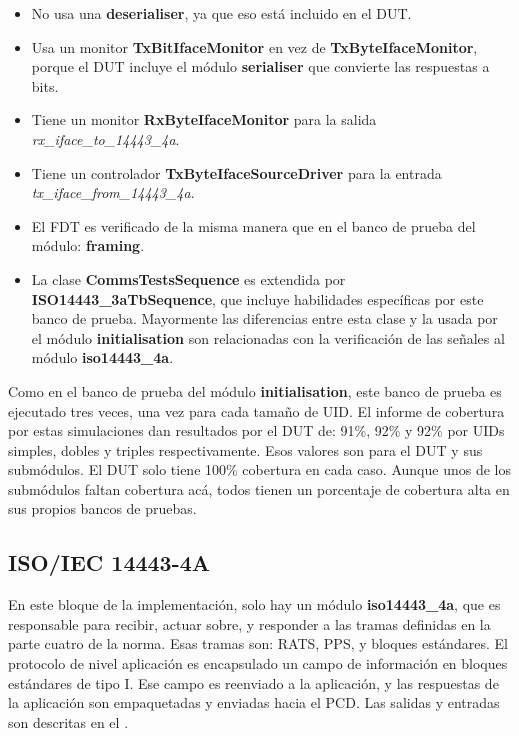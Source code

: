 \documentclass[a4paper, twoside, 11pt]{report}
\begin{document}
\begin{itemize}
  \item No usa una \textbf{deserialiser}, ya que eso está incluido en el DUT.
  \item Usa un monitor \textbf{TxBitIfaceMonitor} en vez de \textbf{TxByteIfaceMonitor}, porque el DUT incluye el módulo \textbf{serialiser} que convierte las respuestas a bits.
  \item Tiene un monitor \textbf{RxByteIfaceMonitor} para la salida \textit{rx\_iface\_to\_14443\_4a}.
  \item Tiene un controlador \textbf{TxByteIfaceSourceDriver} para la entrada \textit{tx\_iface\_from\_14443\_4a}.
  \item El FDT es verificado de la misma manera que en el banco de prueba del módulo: \textbf{framing}.
  \item La clase \textbf{CommsTestsSequence} es extendida por \textbf{ISO14443\_3aTbSequence}, que incluye habilidades específicas por este banco de prueba. Mayormente las diferencias entre esta clase y la usada por el módulo \textbf{initialisation} son relacionadas con la verificación de las señales al módulo \textbf{iso14443\_4a}.
\end{itemize}

Como en el banco de prueba del módulo \textbf{initialisation}, este banco de prueba es ejecutado tres veces, una vez para cada tamaño de UID. El informe de cobertura por estas simulaciones dan resultados por el DUT de: 91\%, 92\% y 92\% por UIDs simples, dobles y triples respectivamente. Esos valores son para el DUT y sus submódulos. El DUT solo tiene 100\% cobertura en cada caso. Aunque unos de los submódulos faltan cobertura acá, todos tienen un porcentaje de cobertura alta en sus propios bancos de pruebas.

\FloatBarrier
\subsection{ISO/IEC 14443-4A}

En este bloque de la implementación, solo hay un módulo \textbf{iso14443\_4a}, que es responsable para recibir, actuar sobre, y responder a las tramas definidas en la parte cuatro de la norma. Esas tramas son: RATS, PPS, y bloques estándares. El protocolo de nivel aplicación es encapsulado un campo de información en bloques estándares de tipo I. Ese campo es reenviado a la aplicación, y las respuestas de la aplicación son empaquetadas y enviadas hacia el PCD. Las salidas y entradas son descritas en el .
\end{document}
